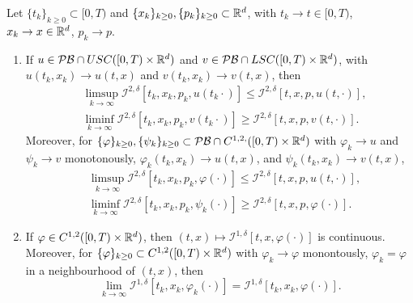 \begin{proposition}
\label{prop: Proposition 5.1 in Seydel}
    Let $\{t_k\}_{k \geq 0} \subset [0,T)$ and $\{x_k\}_{k \geq 0}, \{p_k\}_{k \geq 0} \subset \mathbb{R}^d$, with $t_k \rightarrow t \in [0,T)$, $x_k \rightarrow x \in \mathbb{R}^d$, $p_k \rightarrow p$. 

    \begin{enumerate}[label=(\roman*)]
        \item If $u \in \mathcal{PB} \cap USC([0,T)\times \mathbb{R}^d)$ and $v \in \mathcal{PB} \cap LSC([0,T)\times \mathbb{R}^d)$, with $u(t_k,x_k) \rightarrow u(t,x)$ and $v(t_k,x_k) \rightarrow v(t,x)$, then
        \begin{align*}
            &\limsup_{k \rightarrow \infty} \mathcal{I}^{2,\delta}[t_k,x_k,p_k,u(t_k\cdot)] \leq \mathcal{I}^{2,\delta} [t,x,p,u(t,\cdot)], \\
            &\liminf_{k \rightarrow \infty} \mathcal{I}^{2,\delta}[t_k, x_k, p_k, v(t_k\cdot)] \geq \mathcal{I}^{2, \delta}[t,x,p,v(t,\cdot)].
        \end{align*}
        Moreover, for $\{\varphi\}_{k \geq 0}, \{\psi_k\}_{k \geq 0} \subset \mathcal{PB} \cap C^{1,2,}([0,T) \times \mathbb{R}^d)$ with $\varphi_k \rightarrow u$ and $\psi_k \rightarrow v$ monotonously, $\varphi_k(t_k,x_k) \rightarrow u(t,x)$, and $\psi_k(t_k,x_k) \rightarrow v(t,x)$,
        \begin{align*}
            & \limsup_{k \rightarrow \infty} \mathcal{I}^{2,\delta}[t_k,x_k,p_k,\varphi(\cdot)] \leq \mathcal{I}^{2,\delta}[t,x,p,u(t,\cdot)], \\
            & \liminf_{k \rightarrow \infty} \mathcal{I}^{2,\delta} [t_k,x_k,p_k,\psi_k(\cdot)] \geq \mathcal{I}^{2,\delta}[t,x,p,\varphi(\cdot)].
        \end{align*}
        
        \item If $\varphi \in C^{1,2}([0,T) \times \mathbb{R}^d)$, then $(t,x) \mapsto \mathcal{I}^{1,\delta}[t,x,\varphi(\cdot)]$ is continuous. Moreover, for $\{\varphi\}_{k \geq 0} \subset C^{1,2}([0,T) \times \mathbb{R}^d)$ with $\varphi_k \rightarrow \varphi$ monontously, $\varphi_k = \varphi$ in a neighbourhood of $(t,x)$, then
        \begin{equation*}
            \lim_{k \rightarrow \infty} \mathcal{I}^{1,\delta}[t_k,x_k,\varphi_k(\cdot)] = \mathcal{I}^{1,\delta}[t_k,x_k,\varphi(\cdot)]. 
        \end{equation*}
        

\end{enumerate}
\end{proposition}
